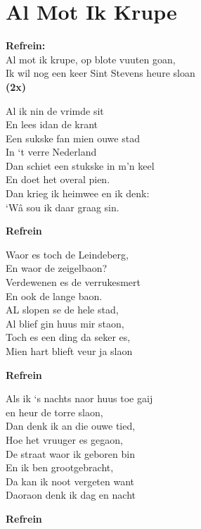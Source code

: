 \section{Al Mot Ik Krupe}
\textbf{Refrein:}\\
Al mot ik krupe, op blote vuuten goan,\\
Ik wil nog een keer Sint Stevens heure sloan\\
\textbf{(2x)}

Al ik nin de vrimde sit\\
En lees idan de krant\\
Een sukske fan mien ouwe stad\\
In ‘t verre Nederland\\
Dan schiet een stukske in m’n keel\\
 En doet het overal pien.\\
Dan krieg ik heimwee en ik denk:\\
‘Wâ sou ik daar graag sin.

\textbf{Refrein}

Waor es toch de Leindeberg,\\
En waor de zeigelbaon?\\
Verdewenen es de verrukesmert\\
En ook de lange baon.\\
AL slopen se de hele stad,\\
Al blief gin huus mir staon,\\
Toch es een ding da seker es,\\
Mien hart blieft veur ja slaon

\textbf{Refrein}

Als ik ‘s nachts naor huus toe gaij\\
en heur de torre slaon,\\
Dan denk ik an die ouwe tied,\\
Hoe het vruuger es gegaon,\\
De straat waor ik geboren bin\\
En ik ben grootgebracht,\\
Da kan ik noot vergeten want\\
Daoraon denk ik dag en nacht

\textbf{Refrein}
